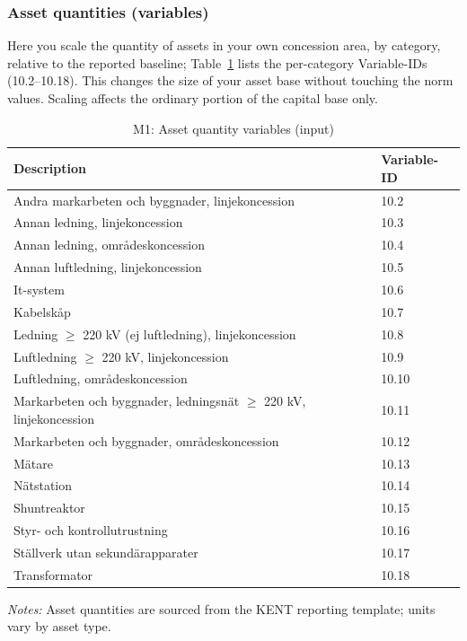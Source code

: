 \subsubsection{Asset quantities (variables)}
Here you scale the quantity of assets in your own concession area, by category, relative to the reported baseline; Table~\ref{tab:app-var-m1} lists the per-category Variable-IDs (10.2--10.18). This changes the size of your asset base without touching the norm values. Scaling affects the ordinary portion of the capital base only.

\begin{table}[H]
\centering
\begin{singlespace}
\footnotesize
\begin{threeparttable}
\caption{M1: Asset quantity variables (input)}
\label{tab:app-var-m1}
\begin{tabular}{@{}p{10cm}l@{}}
\toprule
\textbf{Description} & \textbf{Variable-ID} \\
\midrule
Andra markarbeten och byggnader, linjekoncession & 10.2 \\
Annan ledning, linjekoncession & 10.3 \\
Annan ledning, områdeskoncession & 10.4 \\
Annan luftledning, linjekoncession & 10.5 \\
It-system & 10.6 \\
Kabelskåp & 10.7 \\
Ledning $\geq$ 220 kV (ej luftledning), linjekoncession & 10.8 \\
Luftledning $\geq$ 220 kV, linjekoncession & 10.9 \\
Luftledning, områdeskoncession & 10.10 \\
Markarbeten och byggnader, ledningsnät $\geq$ 220 kV, linjekoncession & 10.11 \\
Markarbeten och byggnader, områdeskoncession & 10.12 \\
Mätare & 10.13 \\
Nätstation & 10.14 \\
Shuntreaktor & 10.15 \\
Styr- och kontrollutrustning & 10.16 \\
Ställverk utan sekundärapparater & 10.17 \\
Transformator & 10.18 \\
\bottomrule
\end{tabular}
\begin{tablenotes}
\item \textit{Notes:} Asset quantities are sourced from the KENT reporting template; units vary by asset type.
\end{tablenotes}
\end{threeparttable}
\end{singlespace}
\end{table}

